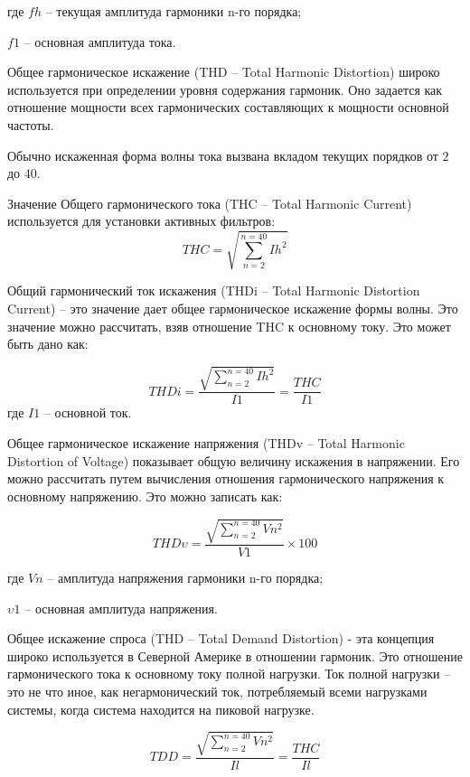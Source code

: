 где $fh$ – текущая амплитуда гармоники n-го порядка;

$f1$ – основная амплитуда тока.

Общее гармоническое искажение (THD – Total Harmonic Distortion) широко используется при определении уровня содержания гармоник. Оно задается как отношение мощности всех гармонических составляющих к мощности основной частоты.

Обычно искаженная форма волны тока вызвана вкладом текущих порядков от $2$ до $40$. 

Значение Общего гармонического тока (THC – Total Harmonic Current) используется для установки активных фильтров:
\begin{equation}
	\label{eq:equation1.13}
	THC = \sqrt{\displaystyle\sum_{n=2}^{n=40} Ih^2}
\end{equation} 

Общий гармонический ток искажения (THDi – Total Harmonic Distortion Current) -- это значение дает общее гармоническое искажение формы волны. Это значение можно рассчитать, взяв отношение THC к основному току. Это может быть дано как:

\begin{equation}
	\label{eq:equation1.14}
	THDi = \frac{\sqrt{\displaystyle\sum_{n=2}^{n=40} Ih^2}}{I1} = \frac{THC}{I1}
\end{equation} 
где $I1$ – основной ток.

Общее гармоническое искажение напряжения (THDv – Total Harmonic Distortion of Voltage) показывает общую величину искажения в напряжении. Его можно рассчитать путем вычисления отношения гармонического напряжения к основному напряжению. Это можно записать как:

\begin{equation}
	\label{eq:equation1.15}
	THD\upsilon = \frac{\sqrt{\displaystyle\sum_{n=2}^{n=40} Vn^2}}{V1} \times 100 
\end{equation} 

где $Vn$ – амплитуда напряжения гармоники n-го порядка;

$\upsilon 1$ – основная амплитуда напряжения.

Общее искажение спроса (THD – Total Demand Distortion) - эта концепция широко используется в Северной Америке в отношении гармоник. Это отношение гармонического тока к основному току полной нагрузки. Ток полной нагрузки – это не что иное, как негармонический ток, потребляемый всеми нагрузками системы, когда система находится на пиковой нагрузке.

\begin{equation}
	\label{eq:equation1.16}
	TDD = \frac{\sqrt{\displaystyle\sum_{n=2}^{n=40} Vn^2}}{Il} = \frac{THC}{Il}
\end{equation} 

